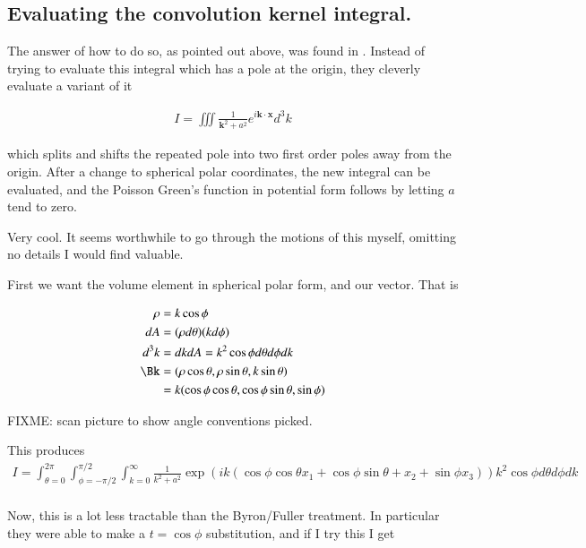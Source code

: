 \subsection{Evaluating the convolution kernel integral. }

The answer of how to do so, as pointed out above, was found in
\cite{byron1992mca}.  Instead of trying to evaluate this integral which has a pole at the origin, they cleverly evaluate a variant of it

\begin{align*}
I = \iiint \frac{1}{\mathbf{k}^2 + a^2} e^{ i \mathbf{k} \cdot \mathbf{x} } d^3 k
\end{align*}

which splits and shifts the repeated pole into two first order poles away from the origin.
After a change to spherical polar coordinates, the new integral can be evaluated, and the Poisson Green's function in potential form follows by
letting $a$ tend to zero.

Very cool.  It seems worthwhile to go through the motions of this myself, omitting no details I would find valuable.

First we want the volume element in spherical polar form, and our vector.  That is

\begin{align*}
\rho &= k \cos\phi \\
dA &= (\rho d\theta)(k d\phi) \\
d^3 k &= dk dA = k^2 \cos\phi d\theta d\phi dk \\
\Bk
&= (\rho \cos\theta, \rho \sin\theta, k \sin\theta) \\
&= k (\cos\phi \cos\theta, \cos\phi \sin\theta, \sin\phi) \\
\end{align*}

FIXME: scan picture to show angle conventions picked.

This produces
\begin{align*}
I = \int_{\theta=0}^{2\pi} \int_{\phi=-\pi/2}^{\pi/2} \int_{k=0}^\infty \frac{1}{k^2 + a^2} \exp\left( i k (\cos\phi \cos\theta x_1 + \cos\phi \sin\theta + x_2 + \sin\phi x_3) \right)
k^2 \cos\phi d\theta d\phi dk \\
\end{align*}

Now, this is a lot less tractable than the Byron/Fuller treatment.  In particular they were able to make a $t = \cos\phi$ substitution, and if I try this I get

